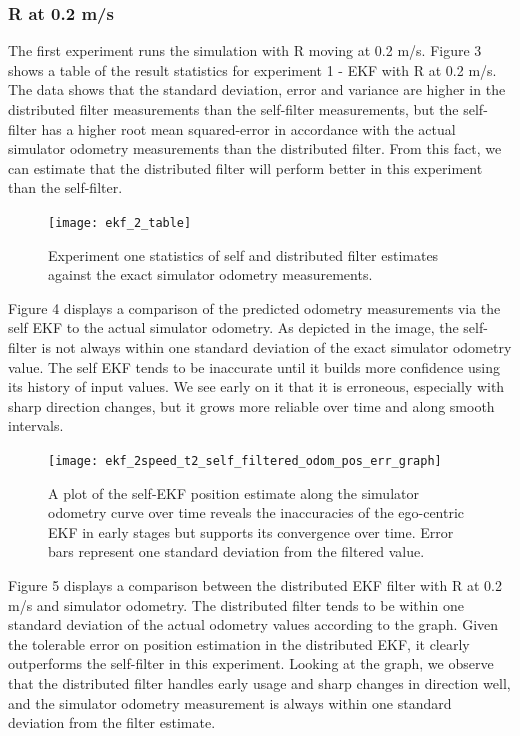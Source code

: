 \documentclass[conference]{IEEEtran} \usepackage[T1]{fontenc} \usepackage[backend=biber, style=ieee]{biblatex}
\begin{document}
\subsubsection{R at 0.2 m/s} \label{EKF .2}
The first experiment runs the simulation with R moving at 0.2 m/s. Figure 3 shows a table of the result statistics for experiment 1 - EKF 
with R at 0.2 m/s. The data shows that the standard deviation, error and variance are higher in the distributed filter measurements than the 
self-filter measurements, but the self-filter has a higher root mean squared-error in accordance with the actual simulator odometry measurements than 
the distributed filter. From this fact, we can estimate that the distributed filter will perform better in this experiment than the self-filter.

\begin{figure}[!ht]
\label{pic3} 
\centering 
\texttt{[image: ekf\_2\_table]}
\caption{Experiment one statistics of self and distributed filter estimates against the exact simulator odometry measurements.} 
\end{figure}

Figure 4 displays a comparison of the predicted odometry measurements via the self EKF to the actual simulator 
odometry. As depicted in the image, the self-filter is not always within one standard deviation of the exact simulator 
odometry value. The self EKF tends to be inaccurate until it builds more confidence using its history of input values. We see early on it that it
is erroneous, especially with sharp direction changes, but it grows more reliable over time and along smooth intervals.

\begin{figure}

\centering 
\texttt{[image: ekf\_2speed\_t2\_self\_filtered\_odom\_pos\_err\_graph]}
\caption {A plot of the self-EKF position estimate along the simulator odometry curve over time 
reveals the inaccuracies of the ego-centric EKF in early stages but supports its convergence over time.
Error bars represent one standard deviation from the filtered value.}
\label{pic4} 
\end{figure}

\par
Figure 5 displays a comparison between the distributed EKF filter with R at 0.2 m/s and simulator odometry. The 
distributed filter tends to be within one standard deviation of the actual odometry values according to the graph. 
Given the tolerable error on position estimation in the distributed EKF, it clearly outperforms the self-filter 
in this experiment. Looking at the graph, we observe that the distributed filter handles early usage and sharp changes in direction well, 
and the simulator odometry measurement is always within one standard deviation from the filter estimate.
\end{document}
